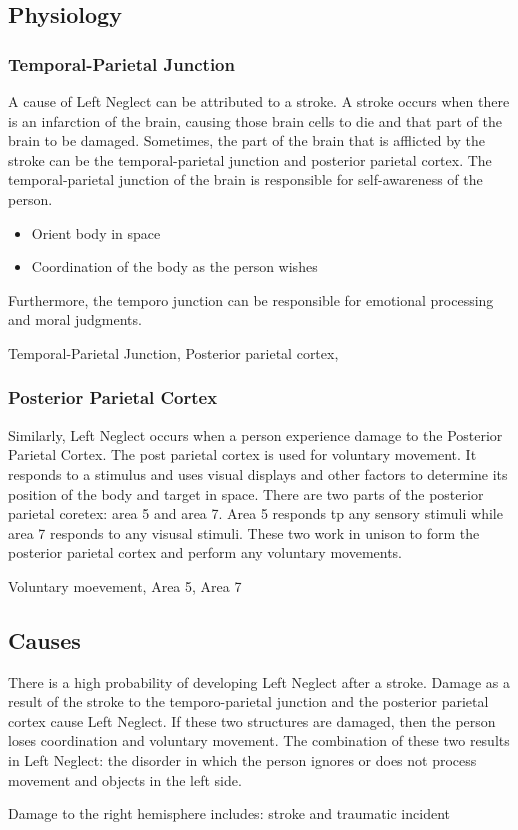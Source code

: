 \documentclass[journal]{IEEEtran}
\begin{document}
\subsection{Physiology}
\subsubsection{Temporal-Parietal Junction}
A cause of Left Neglect can be attributed to a stroke. A stroke occurs when there is an infarction of the brain, causing those brain cells to die and that part of the brain to be damaged. Sometimes, the part of the brain that is afflicted by the stroke can be the temporal-parietal junction and posterior parietal cortex. The temporal-parietal junction of the brain is responsible for self-awareness of the person.
\begin{itemize}
\item Orient body in space
\item Coordination of the body as the person wishes
\end{itemize}
Furthermore, the temporo junction can be responsible for emotional processing and moral judgments.
\begin{IEEEkeywords}
Temporal-Parietal Junction, Posterior parietal cortex,
\end{IEEEkeywords}
\subsubsection{Posterior Parietal Cortex}
Similarly, Left Neglect occurs when a person experience damage to the Posterior Parietal Cortex. The post parietal cortex is used for voluntary movement. It responds to a stimulus and uses visual displays and other factors to determine its position of the body and target in space. There are two parts of the posterior parietal coretex: area 5 and area 7. Area 5 responds tp any sensory stimuli while area 7 responds to any visusal stimuli. These two work in unison to form the posterior parietal cortex and perform any voluntary movements.
\begin{IEEEkeywords}
Voluntary moevement, Area 5, Area 7
\end{IEEEkeywords}
\subsection{Causes}
There is a high probability of developing Left Neglect after a stroke. Damage as a result of the stroke to the temporo-parietal junction and the posterior parietal cortex cause Left Neglect. If these two structures are damaged, then the person loses coordination and voluntary movement. The combination of these two results in Left Neglect: the disorder in which the person ignores or does not process movement and objects in the left side.
\begin{IEEEkeywords}
Damage to the right hemisphere includes: stroke and traumatic incident
\end{IEEEkeywords}
\end{document}
